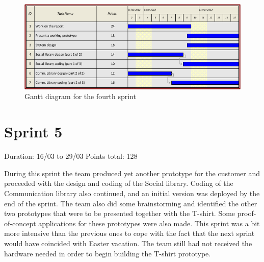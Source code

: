 \begin{figure}[h!]
\centering \includegraphics[scale=0.8]{img/sprints-gantt4.png}
\caption{Gantt diagram for the fourth sprint}
\label{fig:sprints-gantt4}
\end{figure}

\newpage

\section{Sprint 5}

Duration: 16/03 to 29/03\newline
Points total: 128

During this sprint the team produced yet another prototype for the customer
and proceeded with the design and coding of the Social library. Coding of the
Communication library also continued, and an initial version was deployed by the
end of the sprint. The team also did some brainstorming and identified the other
two prototypes that were to be presented together with the T-shirt. Some
proof-of-concept applications for these prototypes were also made. This sprint
was a bit more intensive than the previous ones to cope with the fact that the
next sprint would have coincided with Easter vacation. The team still had not
received the hardware needed in order to begin building the T-shirt prototype.

